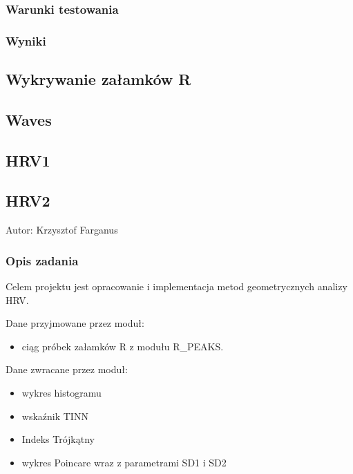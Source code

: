 \documentclass[a4paper, 11pt]{article}
\begin{document}
\subsubsection{Warunki testowania}
\label{sec:baseline:tests}

\subsubsection{Wyniki}
\label{sec:baseline:results}

\subsection{Wykrywanie załamków R}
\label{sec:Rs}

\subsection{Waves}
\label{sec:waves}

\subsection{HRV1}
\label{sec:hrv1}

\subsection{HRV2}
\label{sec:hrv2}

Autor: Krzysztof Farganus


\subsubsection{Opis zadania}
\label{sec:hrv2:desc}

Celem projektu jest opracowanie i implementacja metod geometrycznych
analizy HRV.

Dane przyjmowane przez moduł: 
\begin{itemize}
\item ciąg próbek załamków R z modułu R\_PEAKS.
\end{itemize}
Dane zwracane przez moduł:
\begin{itemize}
\item wykres histogramu 
\item wskaźnik TINN 
\item Indeks Trójkątny
\item wykres Poincare wraz z parametrami SD1 i SD2
\end{itemize}
\end{document}
